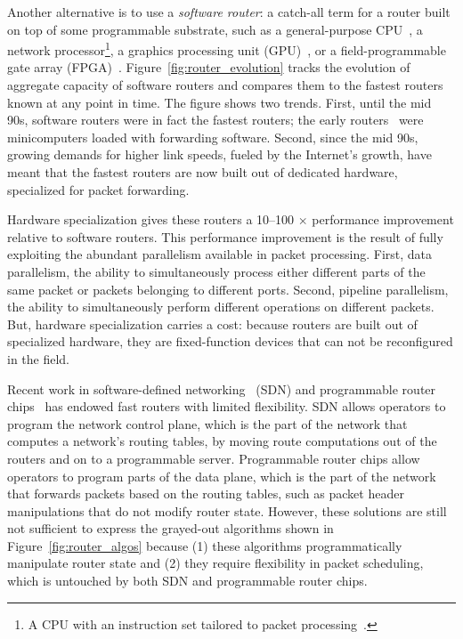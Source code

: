 Another alternative is to use a \textit{software router}: a catch-all term for
a router built on top of some programmable substrate, such as a general-purpose
CPU~\cite{click, routebricks}, a network processor\footnote{A CPU with an
instruction set tailored to packet processing~\cite{ixp4xx, ixp2800}.}, a
graphics processing unit (GPU)~\cite{packetshader}, or a field-programmable
gate array (FPGA)~\cite{netfpga}.  Figure~\ref{fig:router_evolution} tracks the
evolution of aggregate capacity of software routers and compares them to the
fastest routers known at any point in time. The figure shows two trends.
First, until the mid 90s, software routers were in fact the fastest routers;
the early routers~\cite{imp} were minicomputers loaded with forwarding
software. Second, since the mid 90s, growing demands for higher link speeds,
fueled by the Internet's growth, have meant that the fastest routers are now
built out of dedicated hardware, specialized for packet forwarding.

Hardware specialization gives these routers a 10--100 $\times$ performance
improvement relative to software routers.  This performance improvement is the
result of fully exploiting the abundant parallelism available in packet
processing. First, data parallelism, the ability to simultaneously process
either different parts of the same packet or packets belonging to different
ports. Second, pipeline parallelism, the ability to simultaneously perform
different operations on different packets. But, hardware specialization carries
a cost: because routers are built out of specialized hardware, they are
fixed-function devices that can not be reconfigured in the field.

Recent work in software-defined networking~\cite{openflow} (SDN) and
programmable router chips~\cite{rmt, xpliant, flexpipe} has endowed fast
routers with limited flexibility. SDN allows operators to program the network
control plane, which is the part of the network that computes a network's
routing tables, by moving route computations out of the routers and on to a
programmable server. Programmable router chips allow operators to program
parts of the data plane, which is the part of the network that forwards packets
based on the routing tables, such as packet header manipulations that do not
modify router state.  However, these solutions are still not sufficient to
express the grayed-out algorithms shown in Figure~\ref{fig:router_algos}
because (1) these algorithms programmatically manipulate router state and (2)
they require flexibility in packet scheduling, which is untouched by both SDN
and programmable router chips.

